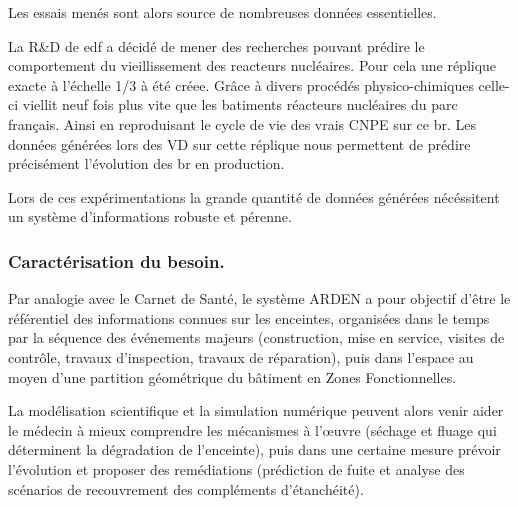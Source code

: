 Les essais menés sont alors source de nombreuses données essentielles.

La R\&D de \gls{edf} a décidé de mener des recherches pouvant prédire le comportement du vieillissement des reacteurs nucléaires. Pour cela une réplique exacte à l'échelle 1/3 à été créee. Grâce à divers procédés physico-chimiques celle-ci viellit neuf fois plus vite que les batiments réacteurs nucléaires du parc français. Ainsi en reproduisant le cycle de vie des vrais CNPE sur ce \gls{br}. Les données générées lors des \gls{VD} sur cette réplique nous permettent de prédire précisément l'évolution des \gls{br} en production.

Lors de ces expérimentations la grande quantité de données générées nécéssitent un système d'informations robuste et pérenne.
\subsubsection{Caractérisation du besoin.}

Par analogie avec le Carnet de Santé, le système ARDEN a pour objectif d’être le référentiel des informations connues sur les enceintes, organisées dans le temps par la séquence des événements majeurs (construction, mise en service, visites de contrôle, travaux d’inspection, travaux de réparation), puis dans l’espace au moyen d’une partition géométrique du bâtiment en Zones Fonctionnelles.

La modélisation scientifique et la simulation numérique peuvent alors venir aider le médecin à mieux comprendre les mécanismes à l’œuvre (séchage et fluage qui déterminent la dégradation de l’enceinte), puis dans une certaine mesure prévoir l’évolution et proposer des remédiations (prédiction de fuite et analyse des scénarios de recouvrement des compléments d’étanchéité).


